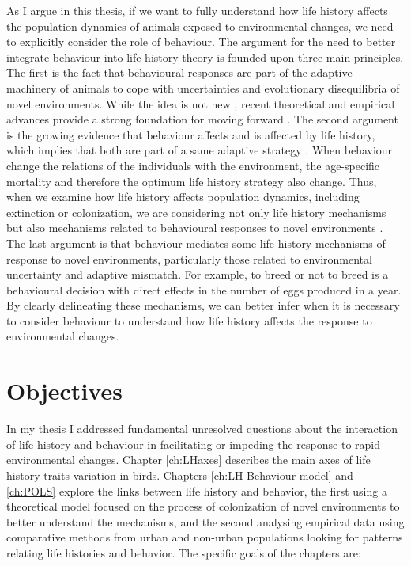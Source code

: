 As I argue in this thesis, if we want to fully understand how life history
affects the population dynamics of animals exposed to environmental changes, we
need to explicitly consider the role of behaviour. The argument for the need
to better integrate behaviour into life history theory is founded upon three
main principles.
The first is the fact that behavioural responses are part of the adaptive
machinery of animals to cope with uncertainties and evolutionary disequilibria
of novel environments. While the idea is not new \citep{mayr1965}, recent
theoretical and empirical advances provide a strong foundation for moving
forward \citep{Sol2020, Ducatez2020}.
The second argument is the growing evidence that behaviour affects and is
affected by life history, which implies that both are part of a same adaptive
strategy \citep{Ricklefs2002,Reale2010a,Sol2016,Sol2016a}. When behaviour
change the relations of the individuals with the environment, the age-specific
mortality and therefore the optimum life history strategy also change. Thus,
when we examine how life history affects population dynamics, including
extinction or colonization, we are considering not only life history mechanisms
but also mechanisms related to behavioural responses to novel environments
\citep{Sol2016}.
The last argument is that behaviour mediates some life history mechanisms of
response to novel environments, particularly those related to environmental
uncertainty and adaptive mismatch. For example, to breed or not to breed is a
behavioural decision with direct effects in the number of eggs produced in a
year.
By clearly delineating these mechanisms, we can better infer when it is
necessary to consider behaviour to understand how life history affects the
response to environmental changes.


\section{Objectives}

In my thesis I addressed fundamental unresolved questions about the 
interaction of life history and behaviour in facilitating or impeding the 
response to rapid environmental changes. Chapter \ref{ch:LHaxes} describes the 
main axes of life history traits variation in birds. Chapters
\ref{ch:LH-Behaviour model} and \ref{ch:POLS} explore the links between life
history and behavior, the first using a theoretical model focused on the process
of colonization of novel environments to better understand the mechanisms, and
the second analysing empirical data using comparative methods from urban and
non-urban populations looking for patterns relating life histories and behavior.
The specific goals of the chapters are:


